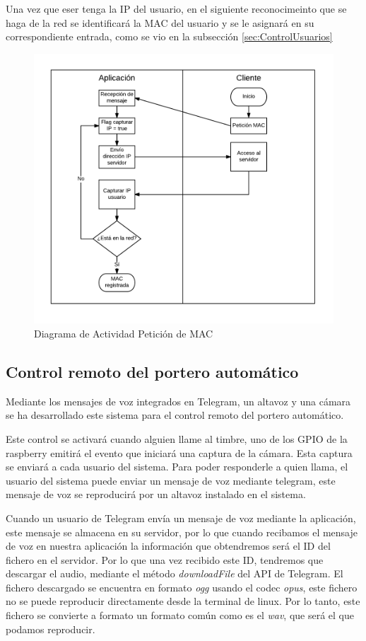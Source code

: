 \documentclass[10pt,journal,compsoc]{IEEEtran}
\begin{document}
Una vez que eser tenga la IP del usuario, en el siguiente reconocimeinto que se 
haga de la red se identificará la MAC del usuario y se le asignará en su 
correspondiente entrada, como se vio en la subsección \ref{sec:ControlUsuarios}

\begin{figure}[h]
\centering
\includegraphics[scale=0.5]{ActMAC}
\caption{Diagrama de Actividad Petición de MAC}
\label{fig:ActMAC}
\end{figure}

\subsection{Control remoto del portero automático}
Mediante los mensajes de voz integrados en Telegram, un altavoz y una cámara se  
ha desarrollado este sistema para el control remoto del portero automático. 

Este control se activará cuando alguien llame al timbre, uno de los GPIO de la 
raspberry emitirá el evento que iniciará una captura de la cámara. Esta 
captura se enviará a cada usuario del sistema. 
Para poder responderle a quien llama, el usuario del sistema puede enviar un mensaje de voz mediante
telegram, este mensaje de voz se reproducirá por un altavoz instalado en el sistema.

Cuando un usuario de Telegram envía un mensaje de voz mediante la aplicación, 
este mensaje se almacena en su servidor, por lo que cuando recibamos el mensaje 
de voz en nuestra aplicación la información que obtendremos será el ID del 
fichero en el servidor. Por lo que una vez recibido este ID, tendremos que 
descargar el audio, mediante el método \textit{downloadFile} del API de 
Telegram.
El fichero descargado se encuentra en formato \textit{ogg} usando el codec 
\textit{opus}, este fichero no se puede reproducir directamente desde la 
terminal de linux. Por lo tanto, este fichero se convierte a formato un formato común como es 
el \textit{wav}, que será el que podamos reproducir.
\end{document}
